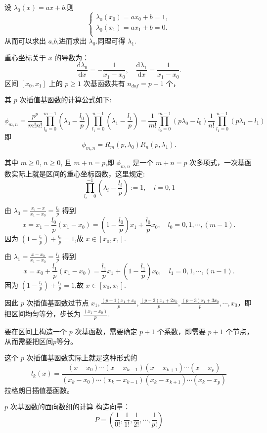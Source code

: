 \documentclass[12pt,a4paper]{article}
\begin{document}
设 $\lambda_0 (x)=ax+b$,则
$$
\begin{cases}
\lambda _0 (x_0)=ax_0+b=1,\\
\lambda _0 (x_1)=ax_1+b=0.\\
\end{cases}
$$
从而可以求出 $a$,$b$,进而求出 $\lambda _0$.同理可得 $\lambda _1$.

重心坐标关于 $x$ 的导数为：
$$
\frac{\mathrm d \lambda_0}{\mathrm dx} = -\frac{1}{x_1 - x_0},\quad 
\frac{\mathrm d \lambda_1}{\mathrm dx} = \frac{1}{x_1 - x_0}.
$$
区间 $[x_0, x_1]$ 上的 $p\geq 1$ 次基函数共有 
$n_{dof} = p+1$ 个，

其 $p$ 次插值基函数的计算公式如下:

$$
\phi_{m,n}  = \frac{p^p}{m!n!}\prod_{l_0 = 0}^{m - 1}(\lambda_0 - \frac{l_0}{p}) \prod_{l_1 = 0}^{n-1}(\lambda_1 -\frac{l_1}{p})
= \frac{1}{m!}\prod_{l_0 = 0}^{m - 1}(p\lambda_0 -l_0)\frac{1}{n!}\prod_{l_1 = 0}^{n - 1}(p\lambda_1 -l_1)
$$
即
$$
\phi_{m,n}= R_m (p,\lambda_0)R_n (p,\lambda_1).
$$

其中 $m\geq 0$, $n\geq 0$, 且 $m+n=p$,即 $\phi_{m,n}$ 是一个 $m+n=p$ 次多项式，一次基函数实际上就是区间的重心坐标函数，这里规定:
$$
 \prod_{l_i=0}^{-1}(\lambda_i - \frac{l_i}{p}) := 1,\quad i=0, 1
$$

由 $\lambda_0=\frac{x_1 - x}{x_1 - x_0}=\frac{l_0}{p}$ 得到
$$
x=x_1-\frac{l_0}{p} (x_1 - x_0)=(1-\frac{l_0}{p})x_1 + \frac{l_0}{p} x_0,\quad l_0=0,1,\cdots ,(m-1).
$$
因为 $(1-\frac{l_0}{p}) + \frac{l_0}{p} =1$,故 $x\in [x_0,x_1].$

由 $\lambda_1=\frac{x - x_0}{x_1 - x_0}=\frac{l_1}{p}$ 得到
$$
x=x_0+\frac{l_1}{p} (x_1 - x_0)=\frac{l_1}{p} x_1 + (1-\frac{l_1}{p})x_0,\quad l_1=0,1,\cdots ,(n-1).
$$
因为 $(1-\frac{l_1}{p}) + \frac{l_1}{p} =1$,故 $x\in [x_0,x_1].$

因此 $p$ 次插值基函数过节点 $x_1,\frac{(p-1)x_1 + x_0}{p},\frac{(p-2)x_1 + 2x_0}{p},\frac{(p-3)x_1 + 3x_0}{p},\cdots,x_0$，即把区间均匀等分，步长为 $\frac{(x_1-x_0)}{p}$.

要在区间上构造一个 $p$ 次基函数，需要确定 $p+1$ 个系数，即需要 $p+1$ 个节点，从而需要把区间$p$等分。

这个 $p$ 次插值基函数实际上就是这种形式的
$$
l_k(x)=\frac{(x-x_0)\cdots(x-x_{k-1})(x-x_{k+1})\cdots(x - x_p)}{(x_k-x_0)\cdots(x_k-x_{k-1})(x_k-x_{k+1})\cdots(x_k-x_p)}
$$
拉格朗日插值基函数。

$p$ 次基函数的面向数组的计算
构造向量：
$$
P = ( \frac{1}{0!},  \frac{1}{1!}, \frac{1}{2!}, \cdots, \frac{1}{p!})
$$
\end{document}
